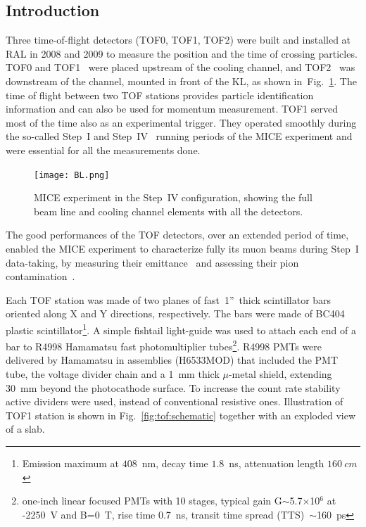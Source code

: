 
\subsection{Introduction}
\label{SubSect:TOF_Intro}

Three time-of-flight detectors (TOF0, TOF1, TOF2) were built and
installed at RAL in 2008 and 2009 to measure the position and the time
of crossing particles.  TOF0 and
TOF1~\cite{NOTE145}\cite{NOTE241}\cite{2010NIMPA.615...14B} were
placed upstream of the cooling channel, and TOF2~\cite{NOTE286} was
downstream of the channel, mounted in front of the KL, as shown
in~Fig.~\ref{fig:BL}.  The time of flight between two TOF stations
provides particle identification information and can also be used for
momentum measurement. TOF1 served most of the time also as an
experimental trigger. They operated smoothly during the so-called
Step~I and Step~IV~\cite{Rajaram:2015bra}\cite{2015ehep.confE.521B}
running periods of the MICE experiment and were essential for all the
measurements done.

\begin{figure}[!ht]
  \begin{center}
    \texttt{[image: BL.png]}
    \caption{MICE experiment in the Step~IV configuration, showing the full beam line and cooling channel elements with all the detectors.}
    \label{fig:BL}
  \end{center}
\end{figure}

The good performances of the TOF detectors, over an extended period of time,
enabled the MICE experiment to characterize fully its muon beams during
Step~I data-taking, by measuring their emittance~\cite{2013arXiv1306.1509T} and
assessing their pion contamination~\cite{2016JInst..11P3001A}.

Each TOF station was made of two planes of fast~1''~thick scintillator
bars oriented along X and Y directions, respectively. The bars were
made of BC404 plastic scintillator\footnote{Emission maximum at
  $408$~nm, decay time $1.8$~ns, attenuation length $160~cm$}. A
simple fishtail light-guide was used to attach each end of a bar to
R4998 Hamamatsu fast photomultiplier tubes\footnote{one-inch linear
focused PMTs with 10 stages, typical gain G$\sim$5.7$\times$10$^6$
at -2250~V and B=0~T, rise time 0.7~ns, transit time spread
(TTS)~$\sim$160~ps}.  R4998 PMTs were delivered by Hamamatsu in
assemblies (H6533MOD) that included the PMT tube, the voltage divider
chain and a 1~mm thick $\mu$-metal shield, extending 30~mm beyond the
photocathode surface.  To increase the count rate stability active
dividers were used, instead of conventional resistive
ones. Illustration of TOF1 station is shown in
Fig.~\ref{fig:tof:schematic} together with an exploded view of a
slab.

